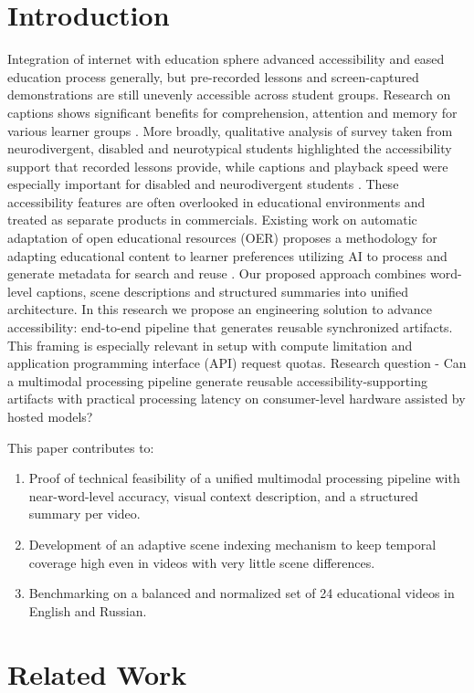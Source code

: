 \documentclass[conference]{IEEEtran}
\begin{document}
\section{Introduction}
Integration of internet with education sphere advanced accessibility and eased education process generally, but pre-recorded lessons and screen-captured demonstrations are still unevenly accessible across student groups. Research on captions shows significant benefits for comprehension, attention and memory for various learner groups \cite{Gernsbacher2015}. More broadly, qualitative analysis of survey taken from neurodivergent, disabled and neurotypical students highlighted the accessibility support that recorded lessons provide, while captions and playback speed were especially important for disabled and neurodivergent students \cite{Horlin2024}. These accessibility features are often overlooked in educational environments and treated as separate products in commercials. Existing work on automatic adaptation of open educational resources (OER) proposes a methodology for adapting educational content to learner preferences utilizing AI to process and generate metadata for search and reuse \cite{IngavelezGuerra2022}. Our proposed approach combines word-level captions, scene descriptions and structured summaries into unified architecture. In this research we propose an engineering solution to advance accessibility: end-to-end pipeline that generates reusable synchronized artifacts. This framing is especially relevant in setup with compute limitation and application programming interface (API) request quotas. Research question - Can a multimodal processing pipeline generate reusable accessibility-supporting artifacts with practical processing latency on consumer-level hardware assisted by hosted models?

This paper contributes to:
\begin{enumerate}
\item Proof of technical feasibility of a unified multimodal processing pipeline with near-word-level accuracy, visual context description, and a structured summary per video.
\item Development of an adaptive scene indexing mechanism to keep temporal coverage high even in videos with very little scene differences.
\item Benchmarking on a balanced and normalized set of 24 educational videos in English and Russian.
\end{enumerate}

\section{Related Work}
\end{document}
